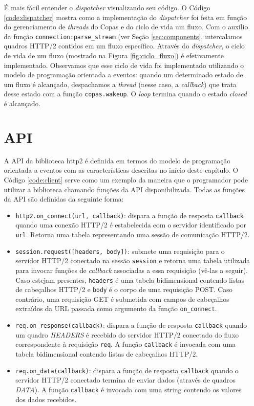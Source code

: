 É mais fácil entender o {\em dispatcher} visualizando seu código. O Código \ref{code:dispatcher} mostra como a implementação do {\em dispatcher} foi feita em função do gerenciamento de {\em threads} do Copas e do ciclo de vida um fluxo. Com o auxílio da função \verb|connection:parse_stream| (ver Seção \ref{sec:components}, intercalamos quadros HTTP/2 contidos em um fluxo específico. Através do {\em dispatcher}, o ciclo de vida de um fluxo (mostrado na Figura \ref{fig:ciclo_fluxo}) é efetivamente implementado. Observamos que esse ciclo de vida foi implementado utilizando o modelo de programação orientada a eventos: quando um determinado estado de um fluxo é alcançado, despachamos a {\em thread} (nesse caso, a {\em callback}) que trata desse estado com a função \verb|copas.wakeup|. O {\em loop} termina quando o estado {\em closed} é alcançado.

\section{API}
\label{sec:api}

A API da biblioteca http2 é definida em termos do modelo de programação orientada a eventos com as características descritas no início deste capítulo. O Código \ref{code:client} serve como um exemplo da maneira que o programador pode utilizar a biblioteca chamando funções da API disponibilizada. Todas as funções da API são definidas da seguinte forma:

\begin{itemize}
    \item \verb|http2.on_connect(url, callback)|: dispara a função de resposta \verb|callback| quando uma conexão HTTP/2 é estabelecida com o servidor identificado por \verb|url|. Retorna uma tabela representando uma sessão de comunicação HTTP/2.
    \item \verb|session.request([headers, body])|: submete uma requisição para o servidor HTTP/2 conectado na sessão \verb|session| e retorna uma tabela utilizada para invocar funções de {\em callback} associadas a essa requisição (vê-las a seguir). Caso estejam presentes, \verb|headers| é uma tabela bidimensional contendo listas de cabeçalhos HTTP/2 e \verb|body| é o corpo de uma requisição POST. Caso contrário, uma requisição GET é submetida com campos de cabeçalhos extraídos da URL passada como argumento da função \verb|on_connect|.
    \item \verb|req.on_response(callback)|: dispara a função de resposta \verb|callback| quando um quadro {\em HEADERS} é recebido do servidor HTTP/2 conectado do fluxo correspondente à requisição \verb|req|. A função \verb|callback| é invocada com uma tabela bidimensional contendo listas de cabeçalhos HTTP/2.
    \item \verb|req.on_data(callback)|: dispara a função de resposta \verb|callback| quando o servidor HTTP/2 conectado termina de enviar dados (através de quadros {\em DATA}). A função \verb|callback| é invocada com uma string contendo os valores dos dados recebidos.
\end{itemize}

